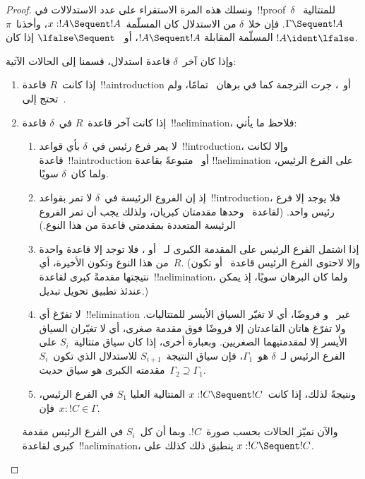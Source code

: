 \documentclass[../../../include/open-logic-section]{subfiles}
\begin{document}
\begin{proof}
ونسلك هذه المرة الاستقراء على عدد الاستدلالات في~!!{proof}~$\delta$
للمتتالية~$\Gamma \Sequent !A$. فإن خلا~$\delta$ من الاستدلال كان
المسلّمة~$x:!A \Sequent !A$، وأخذنا~$\pi$ المسلّمة المقابلة
$!A \Sequent !A$، أو~$\lfalse \Sequent \ $ إذا كان
$!A\ident\lfalse$.

وإذا كان آخر~$\delta$ قاعدة استدلال، قسمنا إلى الحالات الآتية:
\begin{enumerate}
  \item إذا كانت~$R$ قاعدة~!!a{introduction} أو~\FalseInt، جرت الترجمة
  كما في برهان~ تمامًا، ولم تحتج إلى~\Cut.

  \item إذا كانت آخر قاعدة~$R$ في~$\delta$ قاعدة~!!a{elimination}، فلاحظ
  ما يأتي:
  \begin{enumerate}
    \item لا يمر فرع رئيس في~$\delta$ بأي قواعد~!!{introduction}، وإلا
    لكانت قاعدة~!!a{introduction} أو~\FalseInt{} متبوعةً بقاعدة
    !!a{elimination} على الفرع الرئيس، ولما كان~$\delta$ سويًا.
    \item إذ إن الفروع الرئيسة في~$\delta$ لا تمر بقواعد~!!{introduction}،
    فلا يوجد إلا فرع رئيس واحد. (لقاعدة~\Intro{\land} وحدها مقدمتان
    كبريان، ولذلك يجب أن تمر الفروع الرئيسة المتعددة بمقدمتي قاعدة من هذا
    النوع.)
    \item إذا اشتمل الفرع الرئيس على المقدمة الكبرى لـ~\Elim{\lor} أو
    \Elim{\lexists}، فلا توجد إلا قاعدة واحدة من هذا النوع وتكون الأخيرة،
    أي~$R$. (وإلا لاحتوى الفرع الرئيس قاعدة~\Elim{\lor} أو
    \Elim{\lexists} تكون نتيجتها مقدمةً كبرى لقاعدة~!!a{elimination}، ولما
    كان البرهان سويًا، إذ يمكن عندئذ تطبيق تحويل تبديل.)
    \item لا تفرّغ أي~!!{elimination} غير~\Elim{\lor} و\Elim{\lexists}
    فروضًا، أي لا تغيّر السياق الأيسر للمتتاليات. ولا تفرّغ هاتان القاعدتان
    إلا فروضًا فوق مقدمة صغرى، أي لا تغيّران السياق الأيسر إلا لمقدمتيهما
    الصغريين. وبعبارة أخرى، إذا كان سياق متتالية~$S_i$ على الفرع الرئيس
    لـ~$\delta$ هو~$\Gamma_1$، فإن سياق النتيجة~$S_{i+1}$ للاستدلال الذي
    تكون~$S_i$ مقدمته الكبرى هو سياق حديث~$\Gamma_2 \supseteq \Gamma_1$.
    \item ونتيجةً لذلك، إذا كانت~$x:!C \Sequent !C$ المتتالية العليا
    $S_1$ في الفرع الرئيس، فإن~$x:!C \in \Gamma$.
  \end{enumerate}
  والآن نميّز الحالات بحسب صورة~$!C$. وبما أن كل~$S_i$ في الفرع الرئيس
  مقدمة كبرى لقاعدة~!!a{elimination}، ينطبق ذلك كذلك على
  $x:!C \Sequent !C$.


\end{enumerate}
\end{proof}
\end{document}
